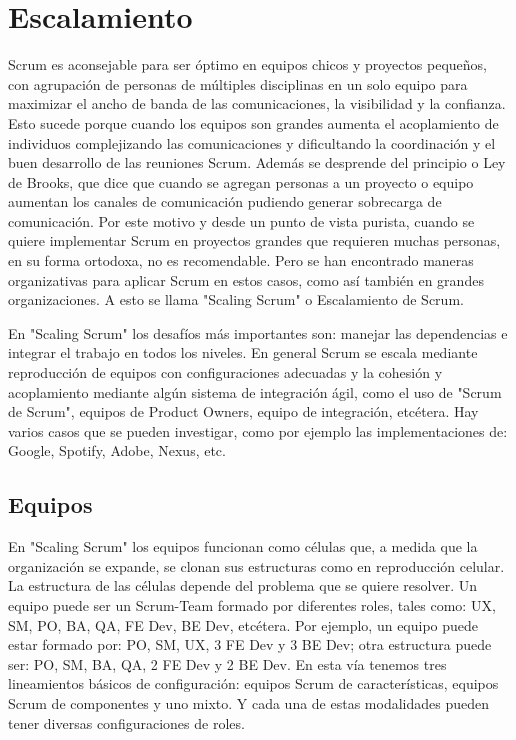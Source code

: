 \chapter{Escalamiento}

Scrum es aconsejable para ser óptimo en equipos chicos y proyectos pequeños, con agrupación de personas de múltiples disciplinas en un solo equipo para maximizar el ancho de banda de las comunicaciones, la visibilidad y la confianza. Esto sucede porque cuando los equipos son grandes aumenta el acoplamiento de individuos complejizando las comunicaciones y dificultando la coordinación y el buen desarrollo de las reuniones Scrum. Además se desprende del principio o Ley de Brooks, que dice que cuando se agregan personas a un proyecto o equipo aumentan los canales de comunicación pudiendo generar sobrecarga de comunicación. Por este motivo y desde un punto de vista purista, cuando se quiere implementar Scrum en proyectos grandes que requieren muchas personas, en su forma ortodoxa, no es recomendable. Pero se han encontrado maneras organizativas para aplicar Scrum en estos casos, como así también en grandes organizaciones. A esto se llama "Scaling Scrum" o Escalamiento de Scrum.

En "Scaling Scrum" los desafíos más importantes son: manejar las dependencias e integrar el trabajo en todos los niveles. En general Scrum se escala mediante reproducción de equipos con configuraciones adecuadas y la cohesión y acoplamiento mediante algún sistema de integración ágil, como el uso de "Scrum de Scrum", equipos de Product Owners, equipo de integración, etcétera. Hay varios casos que se pueden investigar, como por ejemplo las implementaciones de: Google, Spotify, Adobe, Nexus, etc.

\section{Equipos}

En "Scaling Scrum" los equipos funcionan como células que, a medida que la organización se expande, se clonan sus estructuras como en reproducción celular. La estructura de las células depende del problema que se quiere resolver. Un equipo puede ser un Scrum-Team formado por diferentes roles, tales como: UX, SM, PO, BA, QA, FE Dev, BE Dev, etcétera. Por ejemplo, un equipo puede estar formado por: PO, SM, UX, 3 FE Dev y 3 BE Dev; otra estructura puede ser: PO, SM, BA, QA, 2 FE Dev y 2 BE Dev. En esta vía tenemos tres lineamientos básicos de configuración: equipos Scrum de características, equipos Scrum de componentes y uno mixto. Y cada una de estas modalidades pueden tener diversas configuraciones de roles.


